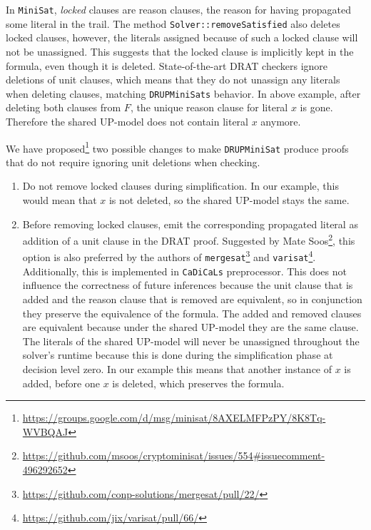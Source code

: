 \documentclass[
]{report}
\begin{document}
In \texttt{MiniSat}, \emph{locked} clauses are reason clauses, the
reason for having propagated some literal in the trail. The method
\texttt{Solver::removeSatisfied} also deletes locked clauses, however,
the literals assigned because of such a locked clause will not be
unassigned. This suggests that the locked clause is implicitly kept in
the formula, even though it is deleted. State-of-the-art DRAT checkers
ignore deletions of unit clauses, which means that they do not unassign
any literals when deleting clauses, matching
\texttt{DRUPMiniSat\textquotesingle{}s} behavior. In above example,
after deleting both clauses from \(F\), the unique reason clause for
literal \(x\) is gone. Therefore the shared UP-model does not contain
literal \(x\) anymore.

We have proposed\footnote{\url{https://groups.google.com/d/msg/minisat/8AXELMFPzPY/8K8Tq-WVBQAJ}}
two possible changes to make \texttt{DRUPMiniSat} produce proofs that do
not require ignoring unit deletions when checking.

\begin{enumerate}
\def\labelenumi{\arabic{enumi}.}
\item
  Do not remove locked clauses during simplification. In our example,
  this would mean that \(x\) is not deleted, so the shared UP-model
  stays the same.
\item
  Before removing locked clauses, emit the corresponding propagated
  literal as addition of a unit clause in the DRAT proof. Suggested by
  Mate Soos\footnote{\url{https://github.com/msoos/cryptominisat/issues/554\#issuecomment-496292652}},
  this option is also preferred by the authors of
  \texttt{mergesat}\footnote{\url{https://github.com/conp-solutions/mergesat/pull/22/}}
  and \texttt{varisat}\footnote{\url{https://github.com/jix/varisat/pull/66/}}.
  Additionally, this is implemented in
  \texttt{CaDiCaL\textquotesingle{}s} preprocessor. This does not
  influence the correctness of future inferences because the unit clause
  that is added and the reason clause that is removed are equivalent, so
  in conjunction they preserve the equivalence of the formula. The added
  and removed clauses are equivalent because under the shared UP-model
  they are the same clause. The literals of the shared UP-model will
  never be unassigned throughout the solver's runtime because this is
  done during the simplification phase at decision level zero. In our
  example this means that another instance of \(x\) is added, before one
  \(x\) is deleted, which preserves the formula.
\end{enumerate}
\end{document}
